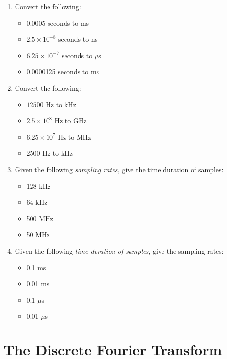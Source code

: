 \documentclass{article}
\begin{document}
\begin{enumerate}
\item Convert the following:
\begin{itemize}
\item 0.0005 seconds to ms
\item $2.5\times 10^{-8}$ seconds to ns
\item $6.25\times 10^{-7}$ seconds to $\mu$s
\item 0.0000125 seconds to ms
\end{itemize}
\item Convert the following:
\begin{itemize}
\item $12500$ Hz to kHz
\item $2.5\times 10^{8}$ Hz to GHz
\item $6.25\times 10^{7}$ Hz to MHz
\item $2500$ Hz to kHz
\end{itemize}
\item Given the following \textit{sampling rates,} give the time duration of samples:
\begin{itemize}
\item 128 kHz
\item 64 kHz
\item 500 MHz
\item 50 MHz
\end{itemize}
\item Given the following \textit{time duration of samples,} give the sampling rates:
\begin{itemize}
\item 0.1 ms
\item 0.01 ms
\item 0.1 $\mu$s
\item 0.01 $\mu$s
\end{itemize}
\end{enumerate}

\section{The Discrete Fourier Transform}
\end{document}
